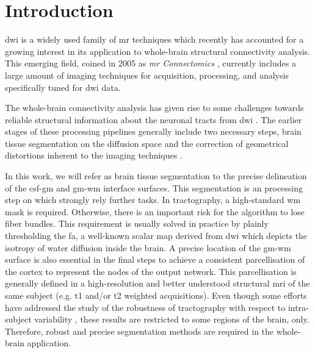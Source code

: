 \section{Introduction}
\label{sec:introduction}
%
\Gls{dwi} is a widely used family of \gls{mr} techniques
\citep{sundgren_diffusion_2004} which recently has accounted for a growing
interest in its application to whole-brain structural connectivity analysis.
This emerging field, coined in 2005 as \emph{\gls{mr} Connectomics}
\citep{hagmann_diffusion_2005,sporns_human_2005}, currently includes a
large amount of imaging techniques for acquisition, processing, and analysis
specifically tuned for \gls{dwi} data.

The whole-brain connectivity analysis has given rise to some challenges
towards reliable structural information
about the neuronal tracts from \gls{dwi} \cite{johansen-berg_using_2009,
jones_white_2012}. The earlier stages of these
processing pipelines generally include two necessary steps, brain tissue
segmentation on the diffusion space and the correction of geometrical
distortions inherent to the imaging techniques \citep{hagmann_mr_2012}.

In this work, we will refer as brain tissue segmentation to the precise
delineation of the \gls{csf}-\gls{gm} and \gls{gm}-\gls{wm} interface surfaces.
This segmentation is an processing step on which strongly rely further
tasks. In tractography, a high-standard \gls{wm} mask is required. Otherwise,
there is an important risk for the algorithm to lose fiber bundles. This
requirement is usually solved in practice by plainly thresholding the 
\gls{fa}, a well-known scalar map derived from \gls{dwi} which depicts 
the isotropy of water diffusion inside the brain. 
A precise location of the
\gls{gm}-\gls{wm} surface is also essential in the final steps to
achieve a consistent parcellisation of the cortex to represent the nodes 
of the output network. This parcellisation is generally defined in a 
high-resolution and better understood structural \gls{mri} of the same 
subject (e.g. \gls{t1} and/or \gls{t2} weighted acquisitions). %
Even though some efforts have addressed
the study of the robustness of tractography with respect to intra-subject variability
\cite{heiervang_between_2006,wakana_reproducibility_2007}, these results are restricted to some regions of the brain, only. Therefore, robust
and precise segmentation methods are required in the whole-brain application. 

